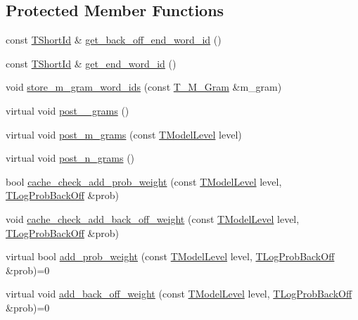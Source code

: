 \subsection*{Protected Member Functions}
\begin{DoxyCompactItemize}
\item 
const \hyperlink{namespaceuva_1_1smt_1_1hashing_adcf22e1982ad09d3a63494c006267469}{T\+Short\+Id} \& \hyperlink{classuva_1_1smt_1_1tries_1_1_a_trie_a3602c8aac334ee6ad76ceed1451d9da9}{get\+\_\+back\+\_\+off\+\_\+end\+\_\+word\+\_\+id} ()
\item 
const \hyperlink{namespaceuva_1_1smt_1_1hashing_adcf22e1982ad09d3a63494c006267469}{T\+Short\+Id} \& \hyperlink{classuva_1_1smt_1_1tries_1_1_a_trie_aebeb72b44be98d1bbe68e65c89ed9422}{get\+\_\+end\+\_\+word\+\_\+id} ()
\item 
void \hyperlink{classuva_1_1smt_1_1tries_1_1_a_trie_a2e9f9d3c04252a42349ea5b3bc526c61}{store\+\_\+m\+\_\+gram\+\_\+word\+\_\+ids} (const \hyperlink{structuva_1_1smt_1_1tries_1_1mgrams_1_1_t___m___gram}{T\+\_\+\+M\+\_\+\+Gram} \&m\+\_\+gram)
\item 
virtual void \hyperlink{classuva_1_1smt_1_1tries_1_1_a_trie_a5bc438e9f7c19bd18a8664527dcec9fb}{post\+\_\+\_\+grams} ()
\item 
virtual void \hyperlink{classuva_1_1smt_1_1tries_1_1_a_trie_ae2ccab11c90970e5f6d5e84e0caa5256}{post\+\_\+m\+\_\+grams} (const \hyperlink{namespaceuva_1_1smt_1_1tries_a20577a44b3a42d26524250634379b7cb}{T\+Model\+Level} level)
\item 
virtual void \hyperlink{classuva_1_1smt_1_1tries_1_1_a_trie_a2e5175e70722e777d00cd38460dc465b}{post\+\_\+n\+\_\+grams} ()
\item 
bool \hyperlink{classuva_1_1smt_1_1tries_1_1_a_trie_aa56ac40acab11016dd544942c94b4bf8}{cache\+\_\+check\+\_\+add\+\_\+prob\+\_\+weight} (const \hyperlink{namespaceuva_1_1smt_1_1tries_a20577a44b3a42d26524250634379b7cb}{T\+Model\+Level} level, \hyperlink{namespaceuva_1_1smt_1_1tries_acd0660255dd9ef5d644f01de49102750}{T\+Log\+Prob\+Back\+Off} \&prob)
\item 
void \hyperlink{classuva_1_1smt_1_1tries_1_1_a_trie_a2c849f75181035f2e247612d410acbd3}{cache\+\_\+check\+\_\+add\+\_\+back\+\_\+off\+\_\+weight} (const \hyperlink{namespaceuva_1_1smt_1_1tries_a20577a44b3a42d26524250634379b7cb}{T\+Model\+Level} level, \hyperlink{namespaceuva_1_1smt_1_1tries_acd0660255dd9ef5d644f01de49102750}{T\+Log\+Prob\+Back\+Off} \&prob)
\item 
virtual bool \hyperlink{classuva_1_1smt_1_1tries_1_1_a_trie_ac6bb33e835e42c2b4c36b6d71f1d936c}{add\+\_\+prob\+\_\+weight} (const \hyperlink{namespaceuva_1_1smt_1_1tries_a20577a44b3a42d26524250634379b7cb}{T\+Model\+Level} level, \hyperlink{namespaceuva_1_1smt_1_1tries_acd0660255dd9ef5d644f01de49102750}{T\+Log\+Prob\+Back\+Off} \&prob)=0
\item 
virtual void \hyperlink{classuva_1_1smt_1_1tries_1_1_a_trie_aac350b954d22273e09db4890d80720e2}{add\+\_\+back\+\_\+off\+\_\+weight} (const \hyperlink{namespaceuva_1_1smt_1_1tries_a20577a44b3a42d26524250634379b7cb}{T\+Model\+Level} level, \hyperlink{namespaceuva_1_1smt_1_1tries_acd0660255dd9ef5d644f01de49102750}{T\+Log\+Prob\+Back\+Off} \&prob)=0
\end{DoxyCompactItemize}
